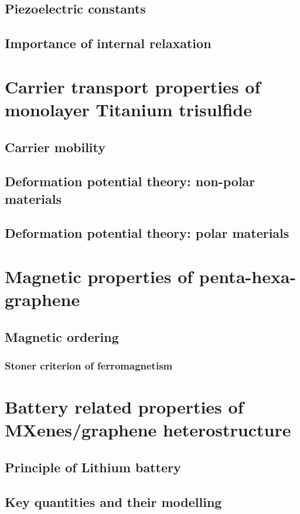 \subsection{Piezoelectric constants}
\subsection{Importance of internal relaxation}

\section{Carrier transport properties of monolayer Titanium trisulfide}
\subsection{Carrier mobility}
\subsection{Deformation potential theory: non-polar materials}
\subsection{Deformation potential theory: polar materials}

\section{Magnetic properties of penta-hexa-graphene}
\subsection{Magnetic ordering}
\subsubsection{Stoner criterion of ferromagnetism}

\section{Battery related properties of MXenes/graphene heterostructure}
\subsection{Principle of Lithium battery}
\subsection{Key quantities and their modelling}